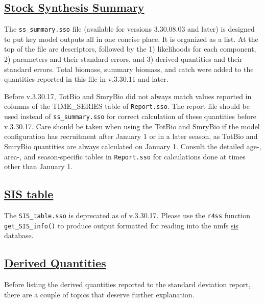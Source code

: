 \hypertarget{SS3Summary}{}
\subsection[Stock Synthesis Summary]{\protect\hyperlink{SS3Summary}{Stock Synthesis Summary}}
The \texttt{ss\_summary.sso} file (available for versions 3.30.08.03 and later) is designed to put key model outputs all in one concise place. It is organized as a list. At the top of the file are descriptors, followed by the 1) likelihoods for each component, 2) parameters and their standard errors, and 3) derived quantities and their standard errors. Total biomass, summary biomass, and catch were added to the quantities reported in this file in v.3.30.11 and later.

Before v.3.30.17, TotBio and SmryBio did not always match values reported in columns of the TIME\_SERIES table of \texttt{Report.sso}. The report file should be used instead of \texttt{ss\_summary.sso} for correct calculation of these quantities before v.3.30.17. Care should be taken when using the TotBio and SmryBio if the model configuration has recruitment after January 1 or in a later season, as TotBio and SmryBio quantities are always calculated on January 1. Consult the detailed age-, area-, and season-specific tables in \texttt{Report.sso} for calculations done at times other than January 1.

\hypertarget{SIStable}{}
\subsection[SIS table]{\protect\hyperlink{SIStable}{SIS table}}
The \texttt{SIS\_table.sso} is deprecated as of v.3.30.17. Please use the \texttt{r4ss} function \texttt{get\_SIS\_info()} to produce output formatted for reading into the \gls{nmfs} \href{https://www.st.nmfs.noaa.gov/sis/}{\gls{sis}} database.

\hypertarget{DerivedQuant}{}
\subsection[Derived Quantities]{\protect\hyperlink{DerivedQuant}{Derived Quantities}}
Before listing the derived quantities reported to the standard deviation report, there are a couple of topics that deserve further explanation.

\hypertarget{VirginUnfished}{}
